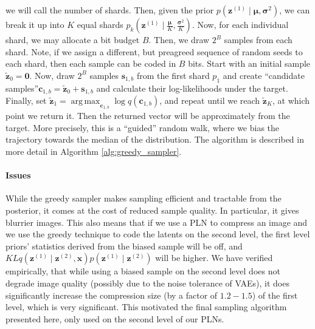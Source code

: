 \documentclass{article}
\renewcommand{\vec}[1]{\mathbf{#1}}
\newcommand{\MU}{\boldsymbol\mu}
\newcommand{\SIGMA}{\boldsymbol\sigma}
\DeclareMathOperator*{\argmax}{arg\,max}
\begin{document}
we will call the number of shards. Then, given the prior $p(\vec{z}^{(1)} \mid
\MU, \SIGMA^2)$, we can break it up into $K$ equal shards $p_k\left(\vec{z}^{(1)}
\mid \frac{\MU}{K}, \frac{\SIGMA^2}{K}\right)$. Now, for each individual shard,
we may allocate a bit budget $B$. Then, we draw $2^B$ samples from each shard.
Note, if we assign a different, but preagreed sequence of random seeds to each
shard, then each sample can be coded in $B$ bits. Start with an initial sample
$\vec{\tilde{z}}_0 = \vec{0}$. Now, draw $2^B$ samples $\vec{s}_{1, b}$ from the
first shard $p_1$ and create ``candidate samples''$\vec{c}_{1, b} =
\vec{\tilde{z}}_0 + \vec{s}_{1, b}$ and calculate their log-likelihoods under the
target. Finally, set $\vec{\tilde{z}}_1 = \argmax_{\vec{c}_{1, b}}\log
q(\vec{c}_{1, b})$, and repeat until we reach $\vec{\tilde{z}}_K$, at which
point we return it. Then the returned vector will be approximately from the
target. More precisely, this is a ``guided'' random walk, where we bias the
trajectory towards the median of the distribution. The algorithm is described in
more detail in Algorithm \ref{alg:greedy_sampler}.
\paragraph{Issues}
While the greedy sampler makes sampling efficient and tractable from the
posterior, it comes at the cost of reduced sample quality. In particular, it
gives blurrier images. This also means that if we use a PLN to compress an
image and we use the greedy technique to code the latents on the second level,
the first level priors' statistics derived from the biased sample will be off,
and $KL{q(\vec{z}^{(1)} \mid \vec{z}^{(2)}, \vec{x})}{p(\vec{z}^{(1)} \mid
  \vec{z}^{(2)})}$ will be higher. We have verified empirically, that while
using a biased sample on the second level does not degrade image quality
(possibly due to the noise tolerance of VAEs), it does significantly increase
the compression size (by a factor of $1.2 - 1.5$) of the first level, which is
very significant. This motivated the final sampling algorithm presented here,
only used on the second level of our PLNs.
\end{document}
